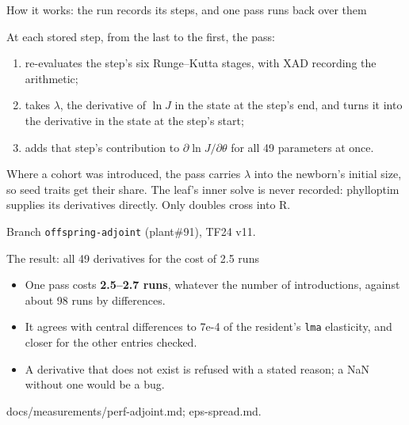 \documentclass[aspectratio=169,10pt]{beamer}
\newcommand{\src}[1]{\par\vfill{\tiny\color{quiet} #1}}
\begin{document}
\begin{frame}{How it works: the run records its steps, and one pass runs back over them}
  \begin{center}
  \end{center}
  \small
  At each stored step, from the last to the first, the pass:
  \begin{enumerate}
    \item re-evaluates the step's six Runge--Kutta stages, with XAD recording the arithmetic;
    \item takes $\lambda$, the derivative of $\ln J$ in the state at the step's end, and turns
      it into the derivative in the state at the step's start;
    \item adds that step's contribution to $\partial\ln J/\partial\theta$ for all 49 parameters
      at once.
  \end{enumerate}
  Where a cohort was introduced, the pass carries $\lambda$ into the newborn's initial size, so
  seed traits get their share. The leaf's inner solve is never recorded: phylloptim supplies its
  derivatives directly. Only doubles cross into R.
  \src{Branch \texttt{offspring-adjoint} (plant\#91), TF24 v11.}
\end{frame}

\begin{frame}{The result: all 49 derivatives for the cost of 2.5 runs}
  \small
  \begin{itemize}
    \item One pass costs \textbf{2.5--2.7 runs}, whatever the number of introductions, against
      about 98 runs by differences.
    \item It agrees with central differences to 7e-4 of the resident's \texttt{lma} elasticity,
      and closer for the other entries checked.
    \item A derivative that does not exist is refused with a stated reason; a NaN without one
      would be a bug.
  \end{itemize}
  \src{docs/measurements/perf-adjoint.md; eps-spread.md.}
\end{frame}
\end{document}
